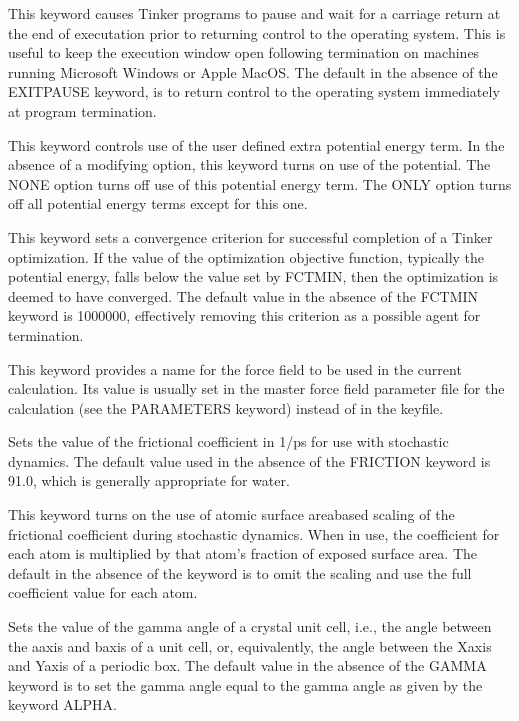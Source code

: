 \documentclass[letterpaper,11pt,english]{sphinxmanual}
\begin{document}
  This keyword causes Tinker programs to pause and wait for a carriage return at the end of executation prior to returning control to the operating system. This is useful to keep the execution window open following termination on machines running Microsoft Windows or Apple MacOS. The default in the absence of the EXIT\sphinxhyphen{}PAUSE keyword, is to return control to the operating system immediately at program termination.

  This keyword controls use of the user defined extra potential energy term. In the absence of a modifying option, this keyword turns on use of the potential. The NONE option turns off use of this potential energy term. The ONLY option turns off all potential energy terms except for this one.

  This keyword sets a convergence criterion for successful completion of a Tinker optimization. If the value of the optimization objective function, typically the potential energy, falls below the value set by FCTMIN, then the optimization is deemed to have converged. The default value in the absence of the FCTMIN keyword is \sphinxhyphen{}1000000, effectively removing this criterion as a possible agent for termination.

  This keyword provides a name for the force field to be used in the current calculation. Its value is usually set in the master force field parameter file for the calculation (see the PARAMETERS keyword) instead of in the keyfile.

  Sets the value of the frictional coefficient in 1/ps for use with stochastic dynamics. The default value used in the absence of the FRICTION keyword is 91.0, which is generally appropriate for water.

  This keyword turns on the use of atomic surface area\sphinxhyphen{}based scaling of the frictional coefficient during stochastic dynamics. When in use, the coefficient for each atom is multiplied by that atom’s fraction of exposed surface area. The default in the absence of the keyword is to omit the scaling and use the full coefficient value for each atom.

  Sets the value of the gamma angle of a crystal unit cell, i.e., the angle between the a\sphinxhyphen{}axis and b\sphinxhyphen{}axis of a unit cell, or, equivalently, the angle between the X\sphinxhyphen{}axis and Y\sphinxhyphen{}axis of a periodic box. The default value in the absence of the GAMMA keyword is to set the gamma angle equal to the gamma angle as given by the keyword ALPHA.
\end{document}
